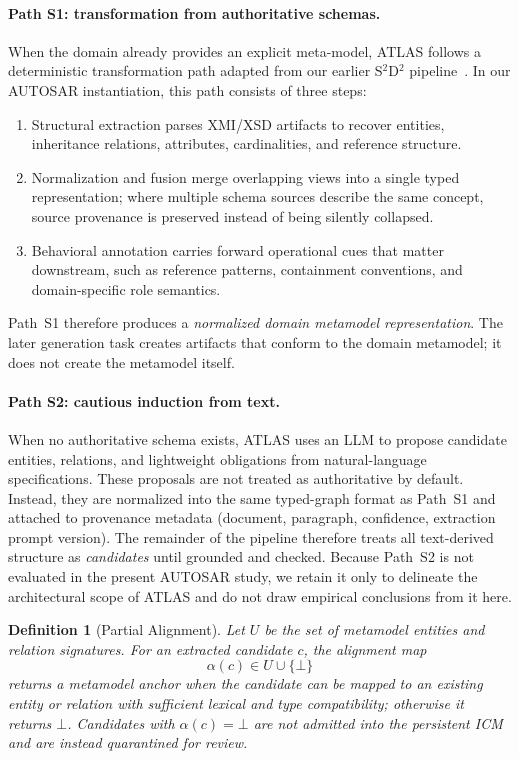 \documentclass[acmlarge,nonacm]{acmart}
\theoremstyle{acmplain}
\theoremstyle{acmdefinition}
\newtheorem{definition}{Definition}[section]
\begin{document}
\paragraph{Path S1: transformation from authoritative schemas.}
When the domain already provides an explicit meta-model, ATLAS follows a deterministic transformation path adapted from our earlier S$^2$D$^2$ pipeline~\cite{DualStageFramework}. In our AUTOSAR instantiation, this path consists of three steps:
\begin{enumerate}[leftmargin=*,nosep]
  \item Structural extraction parses XMI/XSD artifacts to recover entities, inheritance relations, attributes, cardinalities, and reference structure.
  \item Normalization and fusion merge overlapping views into a single typed representation; where multiple schema sources describe the same concept, source provenance is preserved instead of being silently collapsed.
  \item Behavioral annotation carries forward operational cues that matter downstream, such as reference patterns, containment conventions, and domain-specific role semantics.
\end{enumerate}
Path~S1 therefore produces a \emph{normalized domain metamodel representation}. The later generation task creates artifacts that conform to the domain metamodel; it does not create the metamodel itself.

\paragraph{Path S2: cautious induction from text.}
When no authoritative schema exists, ATLAS uses an LLM to propose candidate entities, relations, and lightweight obligations from natural-language specifications. These proposals are not treated as authoritative by default. Instead, they are normalized into the same typed-graph format as Path~S1 and attached to provenance metadata (document, paragraph, confidence, extraction prompt version). The remainder of the pipeline therefore treats all text-derived structure as \emph{candidates} until grounded and checked. Because Path~S2 is not evaluated in the present AUTOSAR study, we retain it only to delineate the architectural scope of ATLAS and do not draw empirical conclusions from it here.

\begin{definition}[Partial Alignment]
\label{def:partial-align}
Let $U$ be the set of metamodel entities and relation signatures. For an extracted candidate $c$, the alignment map
\[
\alpha(c) \in U \cup \{\bot\}
\]
returns a metamodel anchor when the candidate can be mapped to an existing entity or relation with sufficient lexical and type compatibility; otherwise it returns $\bot$. Candidates with $\alpha(c)=\bot$ are not admitted into the persistent ICM and are instead quarantined for review.
\end{definition}
\end{document}
